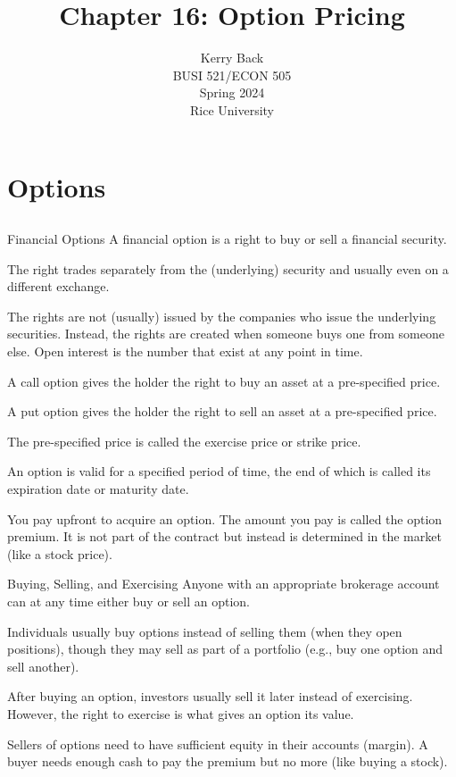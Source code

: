 \documentclass[10pt]{beamer}
\title{Chapter 16: Option Pricing}
\date{}
\author{Kerry Back\\ 
BUSI 521/ECON 505\\
Spring 2024\\
Rice University}
\begin{document}
\maketitle


\section{Options}\subsection{}

\begin{frame}{Financial Options}
    A financial option is a right to buy or sell  a financial security.
    
    The right trades separately from the (underlying) security and usually even on a different exchange.
    
    The rights are not (usually) issued by the companies who issue the underlying securities.  Instead, the rights are created when someone buys one from someone else.  Open interest is the number that exist at any point in time.
    
\end{frame}
\begin{frame}
A \alert{call} option gives the holder the right to \alert{buy} an asset at a pre-specified price.

A \alert{put} option gives the holder the right to \alert{sell} an asset at a pre-specified price.

The pre-specified price is called the exercise price or strike price.  

An option is valid for a specified period of time, the end of which is called its expiration date or maturity date.

You pay upfront to acquire an option.  The amount you pay is called the option premium.  It is not part of the contract but instead is determined in the market (like a stock price).
\end{frame}

\begin{frame}{Buying, Selling, and Exercising}
    Anyone with an appropriate brokerage account can at any time either buy or sell an option.
    
    Individuals usually buy options instead of selling them (when they open positions), though they may sell as part of a portfolio (e.g., buy one option and sell another).
    
    After buying an option, investors usually sell it later instead of exercising.  However, the right to exercise is what gives an option its value.
    
    Sellers of options need to have sufficient equity in their accounts (margin).  A buyer needs enough cash to pay the premium but no more (like buying a stock).
\end{frame}
\end{document}
